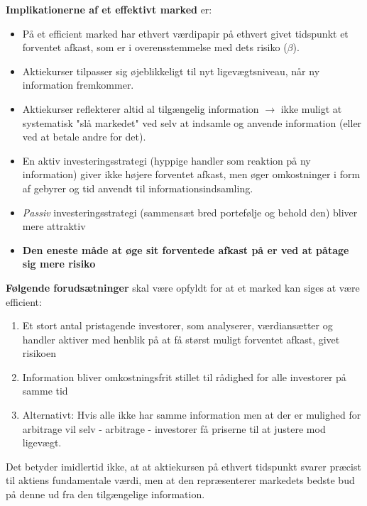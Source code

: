 \documentclass[10pt,reqno, usenames]{article}
\begin{document}
\textbf{Implikationerne af et effektivt marked} er: 
\begin{itemize}
    \item På et efficient marked har ethvert værdipapir på ethvert givet tidspunkt et forventet afkast, som er i overensstemmelse med dets risiko (\(\beta\)).
    \item Aktiekurser tilpasser sig øjeblikkeligt til nyt ligevægtsniveau, når ny information fremkommer.
    \item Aktiekurser reflekterer altid al tilgængelig information $\rightarrow$ ikke muligt at systematisk "slå markedet" ved selv at indsamle og anvende information (eller ved at betale andre for det).
    \item En aktiv investeringsstrategi (hyppige handler som reaktion på ny
information) giver  ikke højere forventet afkast, men øger omkostninger i form af gebyrer og tid anvendt til
informationsindsamling.
\item \textit{Passiv} investeringsstrategi (sammensæt bred portefølje og behold den) bliver  mere attraktiv
\item \textbf{Den eneste måde at øge sit forventede afkast på er ved at påtage sig mere risiko}
\end{itemize}

\textbf{Følgende forudsætninger} skal være opfyldt for at et marked kan siges at være efficient: 

    \begin{enumerate}
        \item Et stort antal pristagende investorer, som analyserer, værdiansætter og handler aktiver med henblik på at få størst muligt forventet afkast, givet risikoen
        \item Information bliver omkostningsfrit stillet til rådighed for alle investorer på samme tid
        \item Alternativt: Hvis alle ikke har samme information men at der er mulighed for arbitrage vil selv - arbitrage - investorer få priserne til at justere mod ligevægt.
    \end{enumerate}

Det betyder imidlertid ikke, at  at aktiekursen på ethvert tidspunkt
svarer præcist til aktiens fundamentale værdi, men at den
repræsenterer markedets bedste bud på denne ud fra den tilgængelige information.

\vspace{10 pt}
\end{document}
